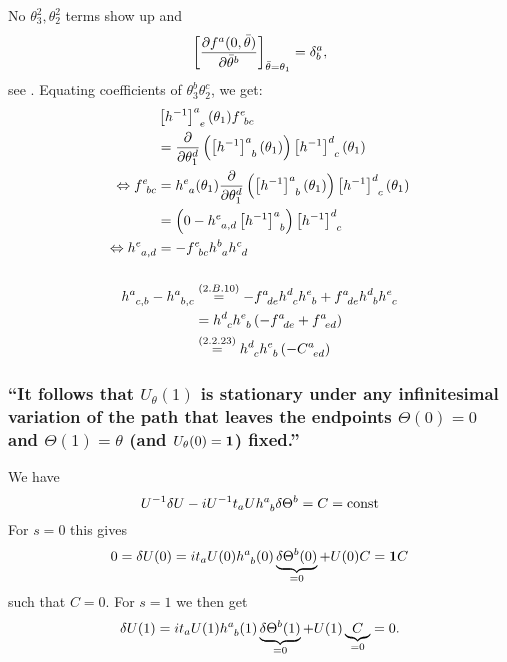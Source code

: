 No $\theta_3^2, \theta_2^2$ terms show up and \[\left[\partialderivative{f^a(0,\bar{\theta})}{\bar{\theta}^b}\right]_{\bar{\theta}=\theta_1}=\delta_b^a,\] see .
Equating coefficients of $\theta^b_3 \theta_2^c$, we get:
\begin{align*} 
	&\left[h^{-1}\right]^a_{\hphantom{a}e}(\theta_1)f^e_{\hphantom{e}bc}\\
	&=\partialderivative{}{\theta_1^d}\left(\left[h^{-1}\right]^a_{\hphantom{a}b}(\theta_1)\right)\left[h^{-1}\right]^d_{\hphantom{d}c}(\theta_1)\\
	\Leftrightarrow f^e_{\hphantom{e}bc}&=h^e_{\hphantom{e}a}(\theta_1)\partialderivative{}{\theta_1^d}\left(\left[h^{-1}\right]^a_{\hphantom{a}b}(\theta_1)\right)\left[h^{-1}\right]^d_{\hphantom{d}c}(\theta_1)\\
	&=\left(0-h^e_{\hphantom{e}a,d}\left[h^{-1}\right]^a_{\hphantom{a}b}\right)\left[h^{-1}\right]^d_{\hphantom{d}c}\\
	\Leftrightarrow h^e_{\hphantom{e}a,d}&=-f^e_{\hphantom{e}bc} h^b_{\hphantom{b}a}h^c_{\hphantom{c}d}
\end{align*}

\subsubsection{ }
\begin{align*} 
	h^a_{\hphantom{a}c,b}-h^a_{\hphantom{a}b,c}
	&\overset{({2.B.10})}{=}-f^a_{\hphantom{a}de} h^d_{\hphantom{d}c}h^e_{\hphantom{e}b}+f^a_{\hphantom{a}de} h^d_{\hphantom{d}b}h^e_{\hphantom{e}c}\\
	&= h^d_{\hphantom{d}c}h^e_{\hphantom{e}b}\left(-f^a_{\hphantom{a}de}+f^a_{\hphantom{a}ed}\right)\\
	&\overset{({2.2.23})}{=} h^d_{\hphantom{d}c}h^e_{\hphantom{e}b} \left(-C^a_{\hphantom{a}ed}\right)
\end{align*}

\subsubsection{\enquote{It follows that $U_\theta(1)$ is stationary under any infinitesimal variation of the path that leaves the endpoints $\Theta(0)=0$ and $\Theta(1)=\theta$ (and $U_\theta(0)=\mathbf{1}$) fixed.} }
We have 
\[U^{-1} \delta U -i U^{-1} t_a U h^a_{\hphantom{a}b}\delta \Theta^b = C = \text{const}\]
For $s=0$ this gives
\[0=\delta U(0) = i t_a U(0) h^a_{\hphantom{a}b}(0)  \underbrace{\delta\Theta^b (0)}_{=0} + U(0) C=\mathbf{1} C\]
such that $C=0$.
For $s=1$ we then get \[\delta U(1) = i t_a U(1) h^a_{\hphantom{a}b}(1) \underbrace{\delta\Theta^b (1)}_{=0} + U(1) \underbrace{C}_{=0}=0.\]

